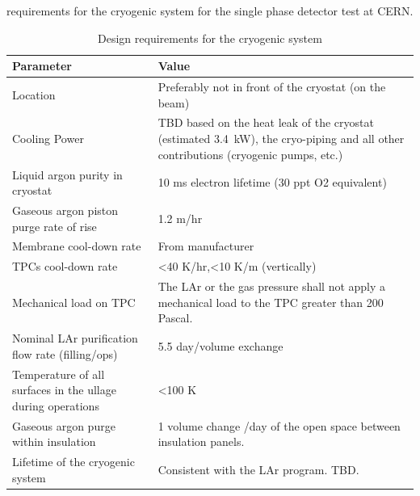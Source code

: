 requirements for the cryogenic system for the single phase detector test at CERN.
%
\begin{table}[htbp]
\centering
\begin{tabular}{|p{}|p{}|}
\hline
 \textbf{ Parameter} & \textbf{Value} \\ \hline
 Location & Preferably not in front of the cryostat (on the beam) \\ \hline
 Cooling Power & TBD based on the heat leak of the cryostat (estimated 3.4~kW), the cryo-piping and all other contributions (cryogenic pumps, etc.) \\ \hline
 Liquid argon purity in cryostat & 10 ms electron lifetime (30 ppt O2 equivalent) \\  \hline
 Gaseous argon piston purge rate of rise & 1.2 m/hr \\ \hline
 Membrane cool-down rate & From manufacturer \\  \hline
 TPCs cool-down rate & \textless40 K/hr,\textless10 K/m (vertically)
 \\ \hline
Mechanical load on TPC & The LAr or the gas pressure shall not apply a mechanical load to the TPC greater than 200 Pascal. \\ \hline
Nominal LAr purification flow rate (filling/ops) & 5.5 day/volume exchange \\ \hline
 Temperature of all surfaces in the ullage during operations & \textless100 K \\  \hline
 Gaseous argon purge within insulation & 1 volume change /day of the open space between insulation panels. \\ \hline
 Lifetime of the cryogenic system & Consistent with the LAr program. TBD. \\ \hline
\end{tabular}
\caption{Design requirements for the cryogenic system}
\label{tbl:cryo-design-parameters}
\end{table}
%


